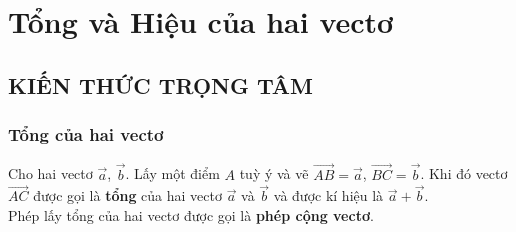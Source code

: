 \newpage
\setcounter{section}{7}
\section{Tổng và Hiệu của hai vectơ}
\subsection{KIẾN THỨC TRỌNG TÂM}
\subsubsection{Tổng  của hai vectơ}
\begin{khung4}{}
	Cho hai vectơ $\overrightarrow{a}$, $\overrightarrow{b}$. Lấy một điểm $A$ tuỳ ý và vẽ
	$\overrightarrow{AB}=\overrightarrow{a}$, $\overrightarrow{BC}=\overrightarrow{b}$.
	Khi đó vectơ $\overrightarrow{AC}$ được gọi là \textbf{tổng} của hai vectơ $\overrightarrow{a}$ và $\overrightarrow{b}$ và được kí hiệu là $\overrightarrow{a}+\overrightarrow{b}$.\\
	Phép lấy tổng của hai vectơ được gọi là \textbf{phép cộng vectơ}.
\end{khung4}
